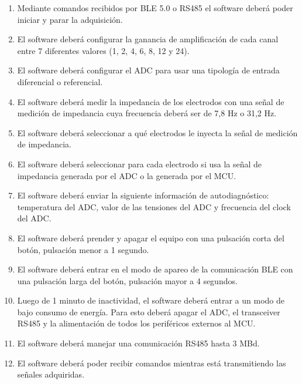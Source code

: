 \begin{enumerate}
\begin{enumerate}
			\item Mediante comandos recibidos por BLE 5.0 o RS485 el software deberá poder iniciar y parar la adquisición.
			\item El software deberá configurar la ganancia de amplificación de cada canal entre 7 diferentes valores (1, 2, 4, 6, 8, 12 y 24).
			\item El software deberá configurar el ADC para usar una tipología de entrada diferencial o referencial.
			\item El software deberá medir la impedancia de los electrodos con una señal de medición de impedancia cuya frecuencia deberá ser de 7,8 Hz o 31,2 Hz.
			\item El software deberá seleccionar a qué electrodos le inyecta la señal de medición de impedancia.
			\item El software deberá seleccionar para cada electrodo si usa la señal de impedancia generada por el ADC o la generada por el MCU.
			\item El software deberá enviar la siguiente información de autodiagnóstico: temperatura del ADC, valor de las tensiones del ADC y frecuencia del clock del ADC.
			\item El software deberá prender y apagar el equipo con una pulsación corta del botón, pulsación menor a 1 segundo.
			\item El software deberá entrar en el modo de apareo de la comunicación BLE con una pulsación larga del botón, pulsación mayor a 4 segundos.
			\item Luego de 1 minuto de inactividad, el software deberá entrar a un modo de bajo consumo de energía. Para esto deberá apagar el ADC, el transceiver RS485 y la alimentación de todos los periféricos externos al MCU.
			\item El software deberá manejar una comunicación RS485 hasta 3 MBd.
			\item El software deberá poder recibir comandos mientras está transmitiendo las señales adquiridas.


\end{enumerate}
\end{enumerate}
